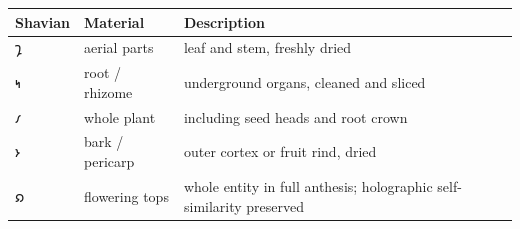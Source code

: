 \begin{longtable}[]{@{}lll@{}}
\toprule
\begin{minipage}[b]{0.30\columnwidth}\raggedright
Shavian\strut
\end{minipage} & \begin{minipage}[b]{0.30\columnwidth}\raggedright
Material\strut
\end{minipage} & \begin{minipage}[b]{0.30\columnwidth}\raggedright
Description\strut
\end{minipage}\tabularnewline
\midrule
\endhead
\begin{minipage}[t]{0.30\columnwidth}\raggedright
𐑡\strut
\end{minipage} & \begin{minipage}[t]{0.30\columnwidth}\raggedright
aerial parts\strut
\end{minipage} & \begin{minipage}[t]{0.30\columnwidth}\raggedright
leaf and stem, freshly dried\strut
\end{minipage}\tabularnewline
\begin{minipage}[t]{0.30\columnwidth}\raggedright
𐑰\strut
\end{minipage} & \begin{minipage}[t]{0.30\columnwidth}\raggedright
root / rhizome\strut
\end{minipage} & \begin{minipage}[t]{0.30\columnwidth}\raggedright
underground organs, cleaned and sliced\strut
\end{minipage}\tabularnewline
\begin{minipage}[t]{0.30\columnwidth}\raggedright
𐑥\strut
\end{minipage} & \begin{minipage}[t]{0.30\columnwidth}\raggedright
whole plant\strut
\end{minipage} & \begin{minipage}[t]{0.30\columnwidth}\raggedright
including seed heads and root crown\strut
\end{minipage}\tabularnewline
\begin{minipage}[t]{0.30\columnwidth}\raggedright
𐑶\strut
\end{minipage} & \begin{minipage}[t]{0.30\columnwidth}\raggedright
bark / pericarp\strut
\end{minipage} & \begin{minipage}[t]{0.30\columnwidth}\raggedright
outer cortex or fruit rind, dried\strut
\end{minipage}\tabularnewline
\begin{minipage}[t]{0.30\columnwidth}\raggedright
𐑸\strut
\end{minipage} & \begin{minipage}[t]{0.30\columnwidth}\raggedright
flowering tops\strut
\end{minipage} & \begin{minipage}[t]{0.30\columnwidth}\raggedright
whole entity in full anthesis; holographic self-similarity
preserved\strut
\end{minipage}\tabularnewline
\bottomrule
\end{longtable}

